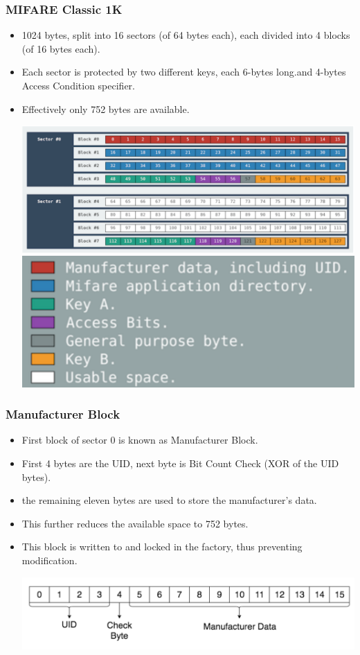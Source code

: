 \documentclass[12pt]{beamer}
\begin{document}
\begin{frame}
\frametitle{MIFARE Classic 1K}
\begin{itemize}
	\item 1024 bytes, split into 16 sectors (of 64 bytes each), each divided into 4 blocks (of 16 bytes each).
	\item Each sector is protected by two different keys, each 6-bytes long.and 4-bytes Access Condition specifier.
	\item Effectively only 752 bytes are available.
	\begin{center}
		\includegraphics[width=0.85\linewidth]{mfc-sectors} \includegraphics[width=0.35\linewidth]{mfc-sectors-legend}
	\end{center}
\end{itemize}
\end{frame}

\begin{frame}
\frametitle{Manufacturer Block}
\begin{itemize}
	\item First block of sector 0 is known as Manufacturer Block.
	\item First 4 bytes are the UID, next byte is Bit Count Check (XOR of the UID bytes).
	\item the remaining eleven bytes are used to store the manufacturer's data.
	\item This further reduces the available space to 752 bytes.
	\item This block is written to and locked in the factory, thus preventing modification.
	\begin{center}
		\includegraphics[width=\linewidth]{manufacturer-block}
	\end{center}
\end{itemize}
\end{frame}
\end{document}

